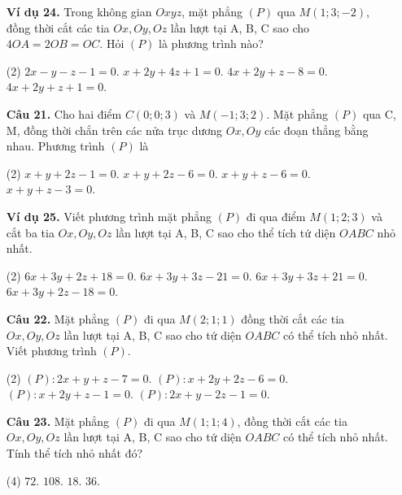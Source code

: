 \documentclass[12pt, a4paper]{article}
\begin{document}
\begin{enumerate}[label=\textbf{\arabic*.}, wide=0pt, leftmargin=*]
    \item[\textbf{Ví dụ 24.}] Trong không gian \(Oxyz\), mặt phẳng \((P)\) qua \(M(1;3;-2)\), đồng thời cắt các tia \(Ox, Oy, Oz\) lần lượt tại A, B, C sao cho \(4OA=2OB=OC\). Hỏi \((P)\) là phương trình nào?
    \begin{tasks}(2)
        \task \(2x-y-z-1=0\).
        \task \(x+2y+4z+1=0\).
        \task \(4x+2y+z-8=0\).
        \task \(4x+2y+z+1=0\).
    \end{tasks}
    
    \item[\textbf{Câu 21.}] Cho hai điểm \(C(0;0;3)\) và \(M(-1;3;2)\). Mặt phẳng \((P)\) qua C, M, đồng thời chắn trên các nửa trục dương \(Ox, Oy\) các đoạn thẳng bằng nhau. Phương trình \((P)\) là
    \begin{tasks}(2)
        \task \(x+y+2z-1=0\).
        \task \(x+y+2z-6=0\).
        \task \(x+y+z-6=0\).
        \task \(x+y+z-3=0\).
    \end{tasks}
    
    \item[\textbf{Ví dụ 25.}] Viết phương trình mặt phẳng \((P)\) đi qua điểm \(M(1;2;3)\) và cắt ba tia \(Ox, Oy, Oz\) lần lượt tại A, B, C sao cho thể tích tứ diện \(OABC\) nhỏ nhất.
    \begin{tasks}(2)
        \task \(6x+3y+2z+18=0\).
        \task \(6x+3y+3z-21=0\).
        \task \(6x+3y+3z+21=0\).
        \task \(6x+3y+2z-18=0\).
    \end{tasks}
    
    \item[\textbf{Câu 22.}] Mặt phẳng \((P)\) đi qua \(M(2;1;1)\) đồng thời cắt các tia \(Ox, Oy, Oz\) lần lượt tại A, B, C sao cho tứ diện \(OABC\) có thể tích nhỏ nhất. Viết phương trình \((P)\).
    \begin{tasks}(2)
        \task \((P): 2x+y+z-7=0\).
        \task \((P): x+2y+2z-6=0\).
        \task \((P): x+2y+z-1=0\).
        \task \((P): 2x+y-2z-1=0\).
    \end{tasks}
    
    \item[\textbf{Câu 23.}] Mặt phẳng \((P)\) đi qua \(M(1;1;4)\), đồng thời cắt các tia \(Ox, Oy, Oz\) lần lượt tại A, B, C sao cho tứ diện \(OABC\) có thể tích nhỏ nhất. Tính thể tích nhỏ nhất đó?
    \begin{tasks}(4)
        \task \(72\).
        \task \(108\).
        \task \(18\).
        \task \(36\).
    \end{tasks}


\end{enumerate}
\end{document}
